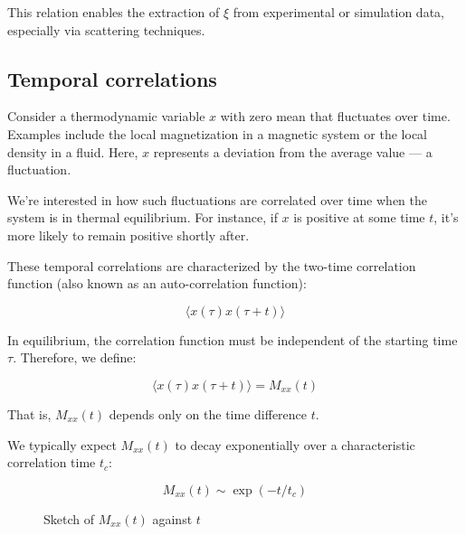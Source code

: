 \documentclass[
  letterpaper,
  enabledeprecatedfontcommands]{report}
\begin{document}
This relation enables the extraction of \(\xi\) from experimental or
simulation data, especially via scattering techniques.

\subsection{Temporal correlations}\label{temporal-correlations}

Consider a thermodynamic variable \(x\) with zero mean that fluctuates
over time. Examples include the local magnetization in a magnetic system
or the local density in a fluid. Here, \(x\) represents a deviation from
the average value --- a fluctuation.

We're interested in how such fluctuations are correlated over time when
the system is in thermal equilibrium. For instance, if \(x\) is positive
at some time \(t\), it's more likely to remain positive shortly after.

These temporal correlations are characterized by the two-time
correlation function (also known as an auto-correlation function):

\[
\langle x(\tau) x(\tau + t) \rangle
\]

In equilibrium, the correlation function must be independent of the
starting time \(\tau\). Therefore, we define:

\[
\langle x(\tau) x(\tau + t) \rangle = M_{xx}(t)
\]

That is, \(M_{xx}(t)\) depends only on the time difference \(t\).

We typically expect \(M_{xx}(t)\) to decay exponentially over a
characteristic correlation time \(t_c\):

\[
M_{xx}(t) \sim \exp(-t / t_c)
\]

\begin{figure}


\caption{\label{fig-Mxx}Sketch of \(M_{xx}(t)\) against \(t\)}

\end{figure}%
\end{document}
